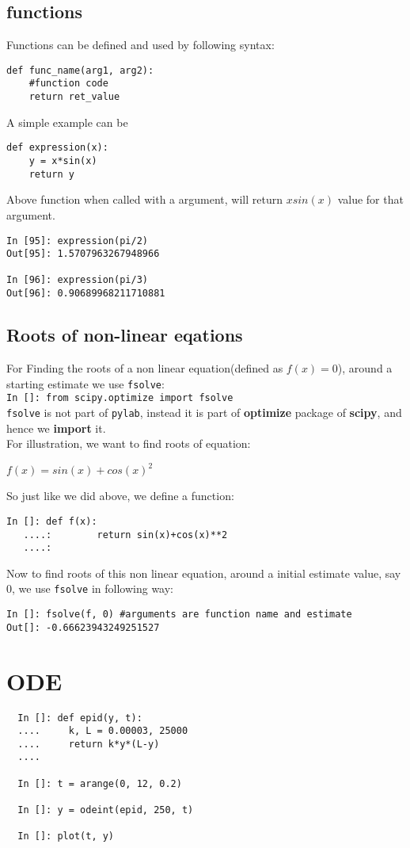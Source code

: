 \documentclass[12pt]{article}
\newcommand{\typ}[1]{\lstinline{#1}}
\begin{document}
\subsection{functions}
Functions can be defined and used by following syntax:
\begin{lstlisting}
def func_name(arg1, arg2):
    #function code
    return ret_value
\end{lstlisting}
A simple example can be
\begin{lstlisting}
def expression(x):
    y = x*sin(x)
    return y
\end{lstlisting}
Above function when called with a argument, will return $xsin(x)$ value for that argument.
\begin{lstlisting}
In [95]: expression(pi/2)
Out[95]: 1.5707963267948966

In [96]: expression(pi/3)
Out[96]: 0.90689968211710881
\end{lstlisting}
\subsection{Roots of non-linear eqations}
For Finding the roots of a non linear equation(defined as $f(x)=0$), around a starting estimate we use \typ{fsolve}:\\
\typ{In []: from scipy.optimize import fsolve}\\
\typ{fsolve} is not part of \typ{pylab}, instead it is part of \textbf{optimize} package of \textbf{scipy}, and hence we \textbf{import} it.\\
For illustration, we want to find roots of equation:
\begin{center}
  $f(x)=sin(x)+cos(x)^2$
\end{center}
So just like we did above, we define a function:
\begin{lstlisting}
In []: def f(x):
   ....:        return sin(x)+cos(x)**2
   ....: 
\end{lstlisting}
Now to find roots of this non linear equation, around a initial estimate value, say 0, we use \typ{fsolve} in following way:
\begin{lstlisting}
In []: fsolve(f, 0) #arguments are function name and estimate
Out[]: -0.66623943249251527
\end{lstlisting}

\section{ODE}
\begin{lstlisting}
  In []: def epid(y, t):
  ....     k, L = 0.00003, 25000
  ....     return k*y*(L-y)
  ....
  
  In []: t = arange(0, 12, 0.2)

  In []: y = odeint(epid, 250, t)

  In []: plot(t, y)
\end{lstlisting}
\end{document}
